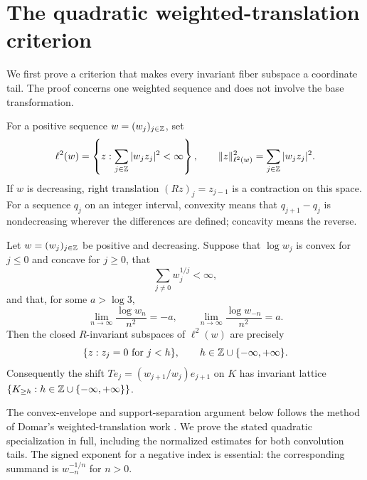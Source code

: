 \section{The quadratic weighted-translation criterion}\label{sec:criterion}
We first prove a criterion that makes every invariant fiber subspace a coordinate tail. The proof concerns one weighted sequence and does not involve the base transformation.

For a positive sequence $w=(w_j)_{j\in\mathbb Z}$, set
\[
 \ell^2(w)=\left\{z:\sum_{j\in\mathbb Z}|w_jz_j|^2<\infty\right\},
 \qquad \lVert z\rVert_{\ell^2(w)}^2=\sum_{j\in\mathbb Z}|w_jz_j|^2.
\]
If $w$ is decreasing, right translation $(Rz)_j=z_{j-1}$ is a contraction on this space. For a sequence $q_j$ on an integer interval, convexity means that $q_{j+1}-q_j$ is nondecreasing wherever the differences are defined; concavity means the reverse.

\begin{lemma}\label{lem:domar}
Let $w=(w_j)_{j\in\mathbb Z}$ be positive and decreasing. Suppose that $\log w_j$ is convex for $j\le0$ and concave for $j\ge0$, that
\begin{equation}\label{eq:root-sum}
 \sum_{j\ne0}w_j^{1/j}<\infty,
\end{equation}
and that, for some $a>\log3$,
\begin{equation}\label{eq:quadratic}
 \lim_{n\to\infty}\frac{\log w_n}{n^2}=-a,
 \qquad
 \lim_{n\to\infty}\frac{\log w_{-n}}{n^2}=a.
\end{equation}
Then the closed $R$-invariant subspaces of $\ell^2(w)$ are precisely
\[
 \{z:z_j=0\text{ for }j<h\},\qquad h\in\mathbb Z\cup\{-\infty,+\infty\}.
\]
Consequently the shift $Te_j=(w_{j+1}/w_j)e_{j+1}$ on $K$ has invariant lattice $\{K_{\ge h}:h\in\mathbb Z\cup\{-\infty,+\infty\}\}$.
\end{lemma}

The convex-envelope and support-separation argument below follows the
method of Domar's weighted-translation work \cite[Section~3]{Domar1981}.
We prove the stated quadratic specialization in full, including the
normalized estimates for both convolution tails.
The signed exponent for a negative index is essential: the corresponding
summand is $w_{-n}^{-1/n}$ for $n>0$.


